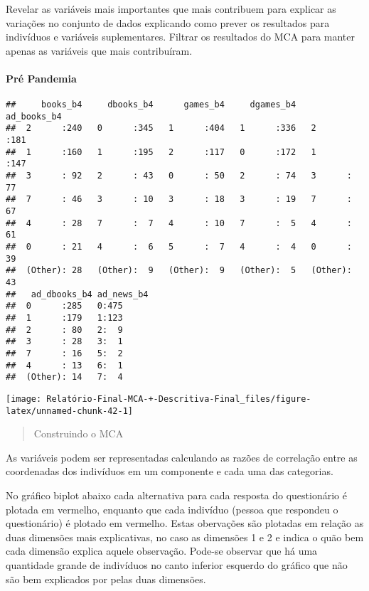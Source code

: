 \documentclass[
]{article}
\begin{document}
Revelar as variáveis mais importantes que mais contribuem para explicar
as variações no conjunto de dados explicando como prever os resultados
para indivíduos e variáveis suplementares. Filtrar os resultados do MCA
para manter apenas as variáveis que mais contribuíram.

\hypertarget{pruxe9-pandemia-1}{%
\paragraph{\texorpdfstring{\textbf{Pré
Pandemia}}{Pré Pandemia}}\label{pruxe9-pandemia-1}}

\begin{verbatim}
##     books_b4     dbooks_b4      games_b4     dgames_b4    ad_books_b4 
##  2      :240   0      :345   1      :404   1      :336   2      :181  
##  1      :160   1      :195   2      :117   0      :172   1      :147  
##  3      : 92   2      : 43   0      : 50   2      : 74   3      : 77  
##  7      : 46   3      : 10   3      : 18   3      : 19   7      : 67  
##  4      : 28   7      :  7   4      : 10   7      :  5   4      : 61  
##  0      : 21   4      :  6   5      :  7   4      :  4   0      : 39  
##  (Other): 28   (Other):  9   (Other):  9   (Other):  5   (Other): 43  
##   ad_dbooks_b4 ad_news_b4
##  0      :285   0:475     
##  1      :179   1:123     
##  2      : 80   2:  9     
##  3      : 28   3:  1     
##  7      : 16   5:  2     
##  4      : 13   6:  1     
##  (Other): 14   7:  4
\end{verbatim}

\begin{center}\texttt{[image: Relatório-Final-MCA-+-Descritiva-Final\_files/figure-latex/unnamed-chunk-42-1]} \end{center}

\begin{quote}
Construindo o MCA
\end{quote}

As variáveis podem ser representadas calculando as razões de correlação
entre as coordenadas dos indivíduos em um componente e cada uma das
categorias.

No gráfico biplot abaixo cada alternativa para cada resposta do
questionário é plotada em vermelho, enquanto que cada indivíduo (pessoa
que respondeu o questionário) é plotado em vermelho. Estas obervações
são plotadas em relação as duas dimensões mais explicativas, no caso as
dimensões 1 e 2 e indica o quão bem cada dimensão explica aquele
observação. Pode-se observar que há uma quantidade grande de indivíduos
no canto inferior esquerdo do gráfico que não são bem explicados por
pelas duas dimensões.
\end{document}
